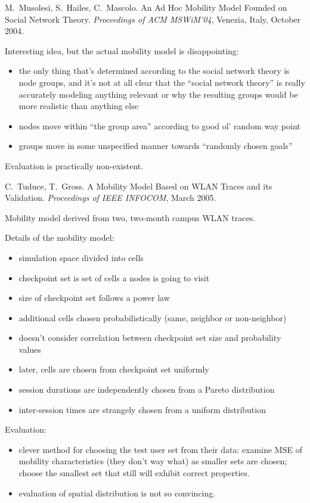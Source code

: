 \documentclass{article}
\newcounter{myEnumCounter}
\newcounter{mySaveCounter}
\renewenvironment{enumerate}{%
  \begin{list}{[\arabic{myEnumCounter}]}{\usecounter{myEnumCounter}%
  \setcounter{myEnumCounter}{\value{mySaveCounter}}}
  }{%
  \setcounter{mySaveCounter}{\value{myEnumCounter}}\end{list}%
}
\begin{document}
\begin{enumerate}
M.~Musolesi, S.~Hailes, C.~Mascolo.
An Ad Hoc Mobility Model Founded on Social Network Theory.
\textit{Proceedings of ACM MSWiM’04}, Venezia, Italy, October 2004.

\begin{notes}
\item Interesting idea, but the actual mobility model is disappointing:
\begin{itemize}
	\item the only thing that's determined according to the social network theory is node groups, and it's not at all clear that the ``social network theory'' is really accurately modeling anything relevant or why the resulting groups would be more realistic than anything else
	\item nodes move within ``the group area'' according to good ol' random way point
	\item groups move in some unspecified manner towards ``randomly chosen goals''
\end{itemize}
\item Evaluation is practically non-existent.
\end{notes}

C.~Tuduce, T.~Gross.
A Mobility Model Based on WLAN Traces and its Validation.
\textit{Proceedings of IEEE INFOCOM}, March 2005.

\begin{notes}
\item Mobility model derived from two, two-month campus WLAN traces.
\item Details of the mobility model:
\begin{itemize}
	\item simulation space divided into cells
	\item checkpoint set is set of cells a nodes is going to visit
	\item size of checkpoint set follows a power law
	\item additional cells chosen probabilistically (same, neighbor or non-neighbor)
	\item doesn't consider correlation between checkpoint set size and probability values
	\item later, cells are chosen from checkpoint set uniformly
	\item session durations are independently chosen from a Pareto distribution
	\item inter-session times are strangely chosen from a uniform distribution
\end{itemize}
\item Evaluation:
\begin{itemize}
	\item clever method for choosing the test user set from their data: examine MSE of mobility characteristics (they don't way what) as smaller sets are chosen; choose the smallest set that still will exhibit correct properties.
	\item evaluation of spatial distribution is not so convincing.
\end{itemize}
\end{notes}


\end{enumerate}
\end{document}
